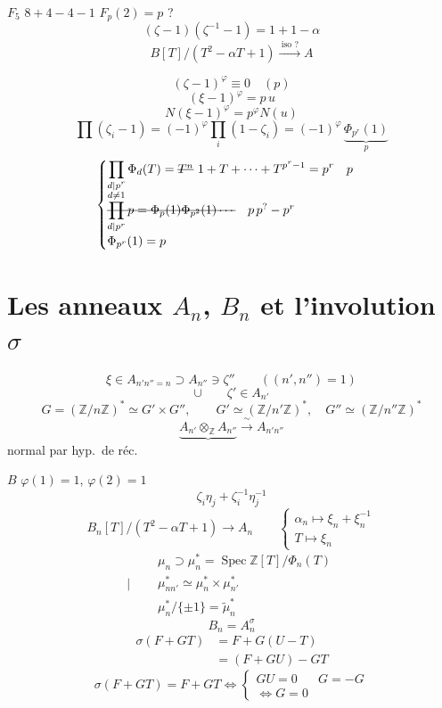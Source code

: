 \documentclass[11pt,a4paper]{article}
\begin{document}

$F_5$ \quad $8+4-4-1$ \qquad $\boxed{F_p(2)=p}$ ?
\[
(\zeta-1)(\zeta^{-1}-1) = 1+1-\alpha
\]
\[
B[T]/(T^2-\alpha T+1) \xrightarrow{\ \text{iso ?}\ } A
\]

\[
(\zeta-1)^{\varphi} \equiv 0 \quad (p)
\]
\[
(\xi-1)^{\varphi} = p\,u
\]
\[
N(\xi-1)^{\varphi} = p^{\varphi} N(u)
\]
\[
\prod(\zeta_i-1) = (-1)^{\varphi}\prod_i(1-\zeta_i) = (-1)^{\varphi}\,\underbrace{\Phi_{p^r}(1)}_{p}
\]
\[
\begin{cases}
\displaystyle\prod_{\substack{d\mid p^r\\ d\neq 1}} \Phi_d(T) = \text{\struck{$T^n$}}\ 1+T+\cdots+T^{p^r-1} = p^r \quad p\\
\text{\struck{$\displaystyle\prod_{d\mid p^r} p = \Phi_p(1)\Phi_{p^2}(1)\cdots$}} \quad p\,p^?-p^r\\
\Phi_{p^r}(1) = p
\end{cases}
\]

\section{Les anneaux $A_n$, $B_n$ et l'involution $\sigma$}

\[
\xi\in A_{n'n''=n} \supset A_{n''}\ni\zeta'' \qquad ((n',n'')=1)
\]
\[
\cup \qquad \zeta'\in A_{n'}
\]
\[
G = (\mathbb{Z}/n\mathbb{Z})^* \simeq G'\times G'', \qquad G'\simeq(\mathbb{Z}/n'\mathbb{Z})^*,\quad G''\simeq(\mathbb{Z}/n''\mathbb{Z})^*
\]
\[
\underbrace{A_{n'}\otimes_{\mathbb{Z}} A_{n''}} \xrightarrow{\ \sim\ } A_{n'n''}
\]
normal par hyp.\ de réc.

$B$ \qquad $\varphi(1)=1$, \quad $\varphi(2)=1$
\[
\zeta_i\eta_j + \zeta_i^{-1}\eta_j^{-1}
\]
\[
B_n[T]/(T^2-\alpha T+1) \longrightarrow A_n \qquad
\begin{cases} \alpha_n\longmapsto \xi_n+\xi_n^{-1}\\ T\longmapsto \xi_n\end{cases}
\]
\[
\Big|\quad
\begin{aligned}
&\mu_n\supset\mu_n^* = \operatorname{Spec}\mathbb{Z}[T]/\Phi_n(T)\\
&\mu_{nn'}^*\simeq\mu_n^*\times\mu_{n'}^*\\
&\mu_n^*/\{\pm1\} = \tilde\mu_n^*
\end{aligned}
\]
\[
B_n = A_n^{\sigma}
\]
\[
\begin{aligned}
\sigma(F+GT) &= F+G(U-T)\\
&= (F+GU)-GT
\end{aligned}
\]
\[
\sigma(F+GT) = F+GT \iff
\begin{cases} GU=0 & G=-G\\ \iff G=0 \end{cases}
\]
\end{document}
